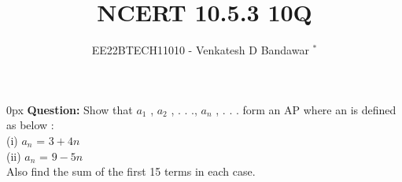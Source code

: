 \documentclass[journal,12pt,twocolumn]{IEEEtran}
\theoremstyle{remark}
\begin{document}

\vspace{3cm}

\title{NCERT 10.5.3 10Q}
\author{EE22BTECH11010 - Venkatesh D Bandawar $^{*}$%
}
\maketitle
\newpage
\bigskip

\renewcommand{\thefigure}{\theenumi}
\renewcommand{\thetable}{\theenumi}

\parindent 0px
\textbf{Question:} Show that $a_1$
, $a_2$
, . . ., $a_n$
, . . . form an AP where an is defined as below :\\
(i) $a_n$ = $3 + 4n$ \\ (ii) $a_n$ = $9 - 5n$ \\
Also find the sum of the first 15 terms in each case.
\end{document}
